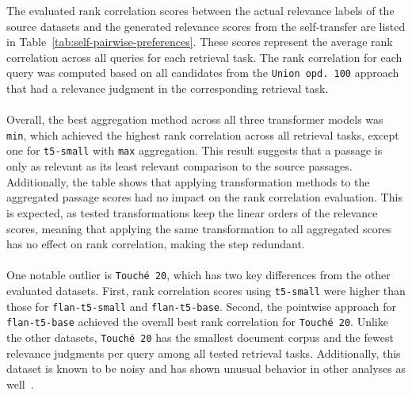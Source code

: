 The evaluated rank correlation scores between the actual relevance labels of the source datasets and the generated relevance scores from the self-transfer are listed in Table~\ref{tab:self-pairwise-preferences}. These scores represent the average rank correlation across all queries for each retrieval task. The rank correlation for each query was computed based on all candidates from the \texttt{Union opd.\ 100} approach that had a relevance judgment in the corresponding retrieval task.
\\\\
Overall, the best aggregation method across all three transformer models was \texttt{min}, which achieved the highest rank correlation across all retrieval tasks, except one for \texttt{t5-small} with \texttt{max} aggregation. This result suggests that a passage is only as relevant as its least relevant comparison to the source passages. Additionally, the table shows that applying transformation methods to the aggregated passage scores had no impact on the rank correlation evaluation. This is expected, as tested transformations keep the linear orders of the relevance scores, meaning that applying the same transformation to all aggregated scores has no effect on rank correlation, making the step redundant.
\\\\
One notable outlier is \texttt{Touché 20}, which has two key differences from the other evaluated datasets. First, rank correlation scores using \texttt{t5-small} were higher than those for \texttt{flan-t5-small} and \texttt{flan-t5-base}. Second, the pointwise approach for \texttt{flan-t5-base} achieved the overall best rank correlation for \mbox{\texttt{Touché 20}}. Unlike the other datasets, \texttt{Touché 20} has the smallest document corpus and the fewest relevance judgments per query among all tested retrieval tasks. Additionally, this dataset is known to be noisy and has shown unusual behavior in other analyses as well~\cite{thakur:2024}.
